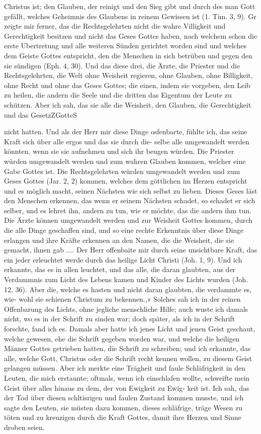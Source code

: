 Christus ist; den Glauben, der reinigt und den Sieg gibt und
durch des man Gott gefällt, welches Geheimnis des Glaubens
in reinem Gewissen ist (1. Tim. 3, 9). Gr zeigte mir ferner, das
die Rechtsgelehrten nicht die wahre Villigkeit und Gerechtigkeit
besitzen und nicht das Geses Gottes haben, nach welchem schon
die erste Ubertretung und alle weiteren Sünden gerichtet worden
sind und welches dem Geiste Gottes entspricht, den die Menschen
in sich betrüben und gegen den sie sündigen (Eph. 4, 30).
Und das diese drei, die Ärzte, die Priester und die Rechtsgelehrten,
die Welt ohne Weisheit regieren, ohne Glauben, ohne Billigkeit,
ohne Recht und ohne das Geses Gottes; die einen, indem sie
vorgeben, den Leib zu heilen, die andern die Seele und die dritten
das Eigentum der Leute zu schützen. Aber ich sah, das sie alle
die Weisheit, den Glauben, die Gerechtigkeit und das GesetzZGotteS


nicht hatten. Und als der Herr mir diese Dinge osfenbarte, fühlte
ich, das seine Kraft sich über alle ergos und das sie durch die-
selbe alle umgewandelt werden könnten, wenn sie sie aufnehmen und
sich ihr beugen würden. Die Priester würden umgewandelt werden
und zum wahren Glauben kommen, welcher eine Gabe Gottes
ist. Die Rechtsgelehrten würden umgewandelt werden und zum
Geses Gottes (Jar. 2, 2) kommen, welches dem göttlichen im
Herzen entspricht und es möglich macht, seinen Nächsten wie sich
selbst zu lieben. Dieses Geses läst den Menschen erkennen, das
wenn er seinem Nächsten schadet, so schadet er sich selber, und
es lehret ihn, andern zu tun, wie er möchte, das die andern ihm
tun. Die Ärzte können umgewandelt werden und zur Weisheit
Gottes kommen, durch die alle Dinge geschaffen sind, und so
eine rechte Erkenntnis über diese Dinge erlangen und ihre Kräfte
erkennen an den Namen, die die Weisheit, die sie gemacht, ihnen
gab ....
Der Herr offenbaite mir durch seine unsichtbare Kraft, das
ein jeder erleuchtet werde durch das heilige Licht Christi (Joh. 1, 9).
Und ich erkannte, das es in allen leuchtet, und das alle, die
daran glaubten, aus der Verdammnis zum Licht des Lebens
kamen und Kinder des Lichts wurden (Joh. 12, 36). Aber die,
welche es hasten und nicht daran glaubten, die verdammte es, wie-
wohl sie schienen Christum zu bekennen.,« Solches sah ich in der
reinen Offenbarung des Lichts, ohne jegliche menschliche Hilfe;
auch wuste ich damals nicht, wo es in der Schrift zu sinden
war; doch später, als ich in der Schrift forschte, fand ich es.
Damals aber hatte ich jenes Licht und jenen Geist geschaut, welche
gewesen, ehe die Schrift gegeben worden war, und welche die
heiligen Männer Gottes getrieben hatten, die Schrift zu schreiben;
und ich erkannte, das alle, welche Gott, Christus oder die Schrift
recht kennen wollen, zu diesem Geist gelangen müssen. Aber ich
merkte eine Trägheit und faule Schläfrigkeit in den Leuten, die
mich erstaunte; oftmals, wenn ich einschlafen wollte, schweifte
mein Geist über alles hinaus zu dem, der von Ewigkeit zu Ewig-
keit ist. Ich sah, das der Tod über diesen schltisrigen und faulen
Zustand kommen musste, und ich sagte den Leuten, sie müsten
dazu kommen, dieses schläfrige, träge Wesen zu töten und zu
kreuzigen durch die Kraft Gottes, damit ihre Herzen und Sinne
droben seien.


